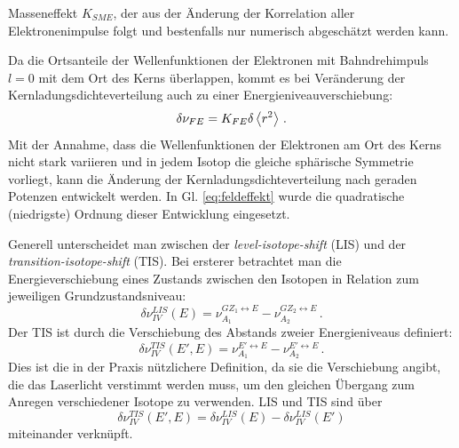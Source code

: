 Masseneffekt $K_{SME}$, der aus der Änderung der Korrelation aller
Elektronenimpulse folgt und bestenfalls nur numerisch abgeschätzt werden
kann. \par
Da die Ortsanteile der Wellenfunktionen der Elektronen mit Bahndrehimpuls
$l=0$ mit dem Ort des Kerns überlappen, kommt es bei Veränderung der
Kernladungsdichteverteilung auch zu einer Energieniveauverschiebung:
\begin{equation}\label{eq:feldeffekt}
	\delta\nu_{FE}=K_{FE}\delta\left\langle r^2\right\rangle\,.
\end{equation}
Mit der Annahme, dass die Wellenfunktionen der Elektronen am Ort des Kerns
nicht stark variieren und in jedem Isotop die gleiche sphärische Symmetrie
vorliegt, kann die Änderung der Kernladungsdichteverteilung nach geraden
Potenzen entwickelt werden. In Gl. \eqref{eq:feldeffekt} wurde
die quadratische (niedrigste) Ordnung dieser Entwicklung eingesetzt.\par
Generell unterscheidet man zwischen der \textit{level-isotope-shift}
(LIS) und der \textit{transition-isotope-shift} (TIS). Bei ersterer betrachtet
man die Energieverschiebung eines Zustands zwischen den Isotopen in Relation zum
jeweiligen Grundzustandsniveau:
\begin{equation}\label{eq:LIS}
	\delta\nu_{IV}^{LIS}(E)=\nu_{A_1}^{GZ_1\leftrightarrow
	E}-\nu_{A_2}^{GZ_2\leftrightarrow E}\,.
\end{equation}
Der TIS ist durch die Verschiebung des Abstands zweier Energieniveaus definiert:
\begin{equation}\label{eq:TIS}
	\delta\nu_{IV}^{TIS}(E',E)=\nu_{A_1}^{E'\leftrightarrow
	E}-\nu_{A_2}^{E'\leftrightarrow E}\,.
\end{equation}
Dies ist die in der Praxis nützlichere Definition, da sie die Verschiebung
angibt, die das Laserlicht verstimmt werden muss, um
den gleichen Übergang zum Anregen verschiedener Isotope zu verwenden. LIS und
TIS sind über
\begin{equation}\label{eq:TIS_LIS_verknuepfung}
	\delta\nu_{IV}^{TIS}(E',E)=\delta\nu_{IV}^{LIS}(E)-\delta\nu_{IV}^{LIS}(E')
\end{equation}
miteinander verknüpft.

